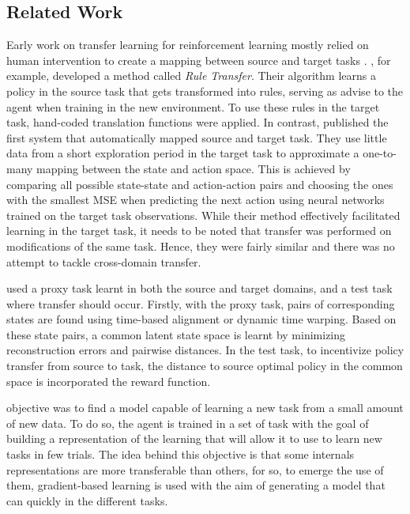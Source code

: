 \iffalse
\subsection{Related Work}
\label{sec:related-work}

Early work on transfer learning for reinforcement learning mostly relied on human intervention to create a mapping between source and target tasks \citep[e.g.][]{taylor2007cross}. \citet{taylor2007cross}, for example, developed a method called \textit{Rule Transfer}. Their algorithm learns a policy in the source task that gets transformed into rules, serving as advise to the agent when training in the new environment. To use these rules in the target task, hand-coded translation functions were applied. In contrast, \citet{taylor2008autonomous} published the first system that automatically mapped source and target task. They use little data from a short exploration period in the target task to approximate a one-to-many mapping between the state and action space. This is achieved by comparing all possible state-state and action-action pairs and choosing the ones with the smallest MSE when predicting the next action using neural networks trained on the target task observations. While their method effectively facilitated learning in the target task, it needs to be noted that transfer was performed on modifications of the same task. Hence, they were fairly similar and there was no attempt to tackle cross-domain transfer. 


\citet{gupta2017learning} used a proxy task learnt in both the source and target domains, and a test task where transfer should occur. Firstly, with the proxy task, pairs of corresponding states are found using time-based alignment or dynamic time warping. Based on these state pairs, a common latent state space is learnt by minimizing reconstruction errors and pairwise distances. In the test task, to incentivize policy transfer from source to task, the distance to source optimal policy in the common space is incorporated the reward function.

\cite{MAML} objective was to find a model capable of learning a new task from a small amount of new data. To do so, the agent is trained in a set of task with the goal of building a representation of the learning that will allow it to use to learn new tasks in few trials. The idea behind this objective is that some internals representations are more transferable than others, for so, to emerge the use of them, gradient-based learning is used with the aim of generating a model that can quickly in the different tasks.

